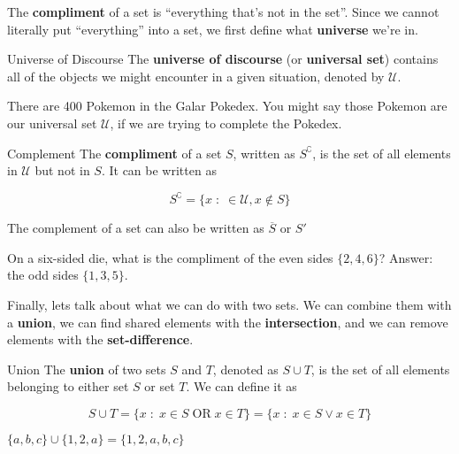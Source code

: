 The {\bf compliment} of a set is ``everything that's not in the set''. Since we cannot literally put ``everything'' into a set, we first define what {\bf universe} we're in. 

\begin{boxdefine}{Universe of Discourse}{}
	The {\bf universe of discourse} (or {\bf universal set}) contains all of the objects we might encounter in a given situation, denoted by $\mathcal{U}$.
\end{boxdefine}

\begin{boxexample}{}{}
	There are 400 Pokemon in the Galar Pokedex. You might say those Pokemon are our universal set $\mathcal{U}$, if we are trying to complete the Pokedex.
\end{boxexample}

\begin{boxdefine}{Complement}{}
	The {\bf compliment} of a set $S$, written as $S^\complement$, is the set of all elements in $\mathcal{U}$ but not in $S$. It can be written as

	\[
		S^\complement = \{x \;:\; \in \mathcal{U}, x \notin S\}
	\]
\end{boxdefine}

\begin{boxnotation*}{}{}
	The complement of a set can also be written as $\overline{S}$ or $S'$
\end{boxnotation*}

\begin{boxexample}{}{}
	On a six-sided die, what is the compliment of the even sides $\{2,4,6\}$? Answer: the odd sides $\{1,3,5\}$.
\end{boxexample}

Finally, lets talk about what we can do with two sets. We can combine them with a {\bf union}, we can find shared elements with the {\bf intersection}, and we can remove elements with the {\bf set-difference}.

\begin{boxdefine}{Union}{}
	The {\bf union} of two sets $S$ and $T$, denoted as $S \cup T$, is the set of all elements belonging to either set $S$ or set $T$. We can define it as

	\[
		S \cup T = \{x \;:\; x \in S \;\text{OR}\; x \in T \} = \{x \;:\; x \in S \lor x \in T \}
	\]
\end{boxdefine}

\begin{boxexample}{}{}
	$\{a,b,c\} \cup \{1,2,a\} = \{1,2,a,b,c\}$
\end{boxexample}

